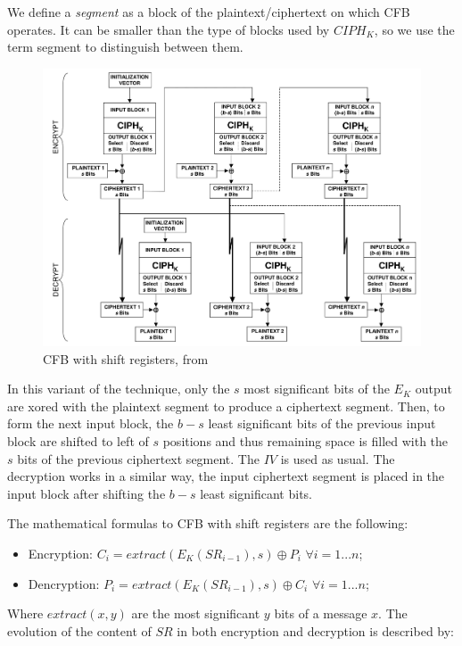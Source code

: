 \documentclass[11pt]{article}
\newcommand\CIPH{C\!I\!P\!H_K}
\begin{document}
We define a {\em segment} as a block of the plaintext/ciphertext on which CFB operates. It can be smaller than the type of blocks used by $\CIPH$, so we use the term segment to distinguish between them.

\begin{figure}[!ht]
  \centering
  \includegraphics[width=1\textwidth]{pic3-hw1-1692419}
  \caption{CFB with shift registers, from \cite{nist}}
  \label{fig:cfb_shift}
\end{figure}

In this variant of the technique, only the $s$ most significant bits of the $E_K$ output are xored with the plaintext segment to produce a ciphertext segment. Then, to form the next input block, the $b - s$ least significant bits of the previous input block are shifted to left of $s$ positions and thus remaining space is filled with the $s$ bits of the previous ciphertext segment. The $IV$ is used as usual.
The decryption works in a similar way, the input ciphertext segment is placed in the input block after shifting the $b - s$ least significant bits.

The mathematical formulas to CFB with shift registers are the following:

\begin{itemize}
\item Encryption: $C_i = extract(E_K(SR_{i-1}), s) \oplus P_i$ $\forall i = 1...n$;
\item Dencryption: $P_i = extract(E_K(SR_{i-1}), s) \oplus C_i$ $\forall i = 1...n$;
\end{itemize}

Where $extract(x, y)$ are the most significant $y$ bits of a message $x$. The evolution of the content of $SR$ in both encryption and decryption is described by:
\end{document}
